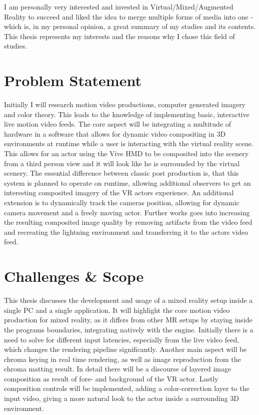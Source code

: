 I am personally very interested and invested in Virtual/Mixed/Augmented Reality 
to succeed and liked the idea to merge multiple forms of media into one - which 
is, in my personal opinion, a great summary of my studies and its contents. 
This thesis represents my interests and the reasons why I chose this field of 
studies.

\section{Problem Statement}
\label{sec:intro:problem}

Initially I will research motion video productions, computer generated imagery 
and color theory. This leads to the knowledge of implementing basic, 
interactive live motion video feeds.
\newline
The core aspect will be integrating a multitude of hardware in a software that 
allows for dynamic video compositing in 3D environments at runtime while a user 
is interacting with the virtual reality scene. This allows for an actor using 
the Vive HMD to be composited into the scenery from a third person view 
and it will look like he is surrounded by the virtual scenery. The essential 
difference between classic post production is, that this system is planned to 
operate on runtime, allowing additional observers to get an interesting 
composited imagery of the VR actors experience.
\newline
An additional extension is to dynamically track the cameras position, allowing 
for dynamic camera movement and a freely moving actor. Further works goes into 
increasing the resulting composited image quality by removing artifacts from 
the video feed and recreating the lightning environment and transferring it to 
the actors video feed. 

\section{Challenges \& Scope}
\label{sec:intro:challenges}

This thesis discusses the development and usage of a mixed reality setup inside 
a single PC and a single application.
\newline
It will highlight the core motion video production for mixed reality, as it 
differs from other MR setups by staying inside the programs boundaries, 
integrating natively with the engine. Initially there is a need to solve for 
different input latencies, especially from the live video feed, which changes 
the rendering pipeline significantly.
\newline
Another main aspect will be chroma keying in real time rendering, as well as 
image reproduction from the chroma matting result. In detail there will be a 
discourse of layered image composition as result of fore- and background of the 
VR actor.
\newline
Lastly composition controls will be implemented, adding a color-correction 
layer to the input video, giving a more natural look to the actor inside a 
surrounding 3D environment.

